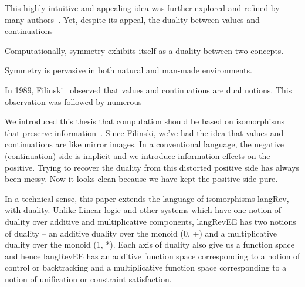 \documentclass[preprint]{sigplanconf}
\begin{document}
{This highly intuitive and appealing idea was further explored and refined by
many authors~\cite{Griffin:1989:FNC:96709.96714, Curien:2000,
  Wadler:2003, DBLP:conf/rta/Wadler05}. Yet, despite its appeal, the duality
between values and continuations 

Computationally, symmetry exhibits itself as a duality between two concepts.

Symmetry is pervasive in both natural and man-made environments. 

In 1989, Filinski~\cite{Filinski:1989:DCI:648332.755574} observed that values
and continuations are dual notions. This observation was followed by numerous

We introduced this thesis that computation should be based on isomorphisms
that preserve information~\cite{infeffects}. Since Filinski, we've had the
idea that values and continuations are like mirror images. In a conventional
language, the negative (continuation) side is implicit and we introduce
information effects on the positive. Trying to recover the duality from this
distorted positive side has always been messy. Now it looks clean because we
have kept the positive side pure.

In a technical sense, this paper extends the language of isomorphisms
{{langRev}}, with duality. Unlike Linear logic \cite{Girard87tcs} and
other systems which have one notion of duality over additive and
multiplicative components, {{langRevEE}} has two notions of duality
-- an additive duality over the monoid {{(0, +)}} and a multiplicative
duality over the monoid {{(1, *)}}. Each axis of duality also give us
a function space and hence {{langRevEE}} has an additive function
space corresponding to a notion of control or backtracking and a
multiplicative function space corresponding to a notion of unification
or constraint satisfaction.

}
\end{document}
